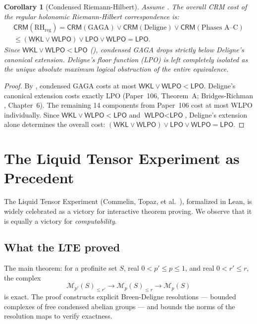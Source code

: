 \documentclass[11pt,a4paper]{article}
\theoremstyle{plain}
\newtheorem{corollary}[theorem]{Corollary}
\theoremstyle{definition}
\newcommand{\WKL}{\textsf{WKL}}
\newcommand{\WLPO}{\textsf{WLPO}}
\newcommand{\LPO}{\textsf{LPO}}
\newcommand{\CRM}{\textsf{CRM}}
\begin{document}
\begin{corollary}[Condensed Riemann-Hilbert]\label{cor:condensed-rh}
Assume .
The overall CRM cost of the regular holonomic Riemann-Hilbert correspondence is:
\begin{multline*}
\CRM(\text{RH}_{\text{reg}}) = \CRM(\text{GAGA}) \vee \CRM(\text{Deligne}) \vee \CRM(\text{Phases A--C}) \\
\le (\WKL \vee \WLPO) \vee \LPO \vee \WLPO = \LPO.
\end{multline*}
Since $\WKL \vee \WLPO < \LPO$ (), condensed GAGA drops \emph{strictly below} Deligne's canonical extension.
Deligne's floor function (\LPO) is left completely isolated as the unique absolute maximum logical obstruction of the entire equivalence.
\end{corollary}

\begin{proof}
By , condensed GAGA costs at most $\WKL \vee \WLPO < \LPO$.
Deligne's canonical extension costs exactly \LPO{} (Paper~106, Theorem~A; Bridges-Richman \cite{BridgesRichman1987}, Chapter~6).
The remaining 14 components from Paper~106 cost at most \WLPO{} individually.
Since $\WKL \vee \WLPO < \LPO$ and $\WLPO < \LPO$, Deligne's extension alone determines the overall cost: $(\WKL \vee \WLPO) \vee \LPO \vee \WLPO = \LPO$.
\end{proof}

\section{The Liquid Tensor Experiment as Precedent}
\label{sec:lte}

The Liquid Tensor Experiment (Commelin, Topaz, et al.\ \cite{Commelin2022}), formalized in Lean, is widely celebrated as a victory for interactive theorem proving.
We observe that it is equally a victory for \emph{computability}.

\subsection{What the LTE proved}

The main theorem: for a profinite set $S$, real $0 < p' \le p \le 1$, and real $0 < r' \le r$, the complex
\[
\mathcal{M}_{p'}(S)_{\le r'} \to \mathcal{M}_p(S)_{\le r} \to \mathcal{M}_p(S)
\]
is exact.
The proof constructs explicit Breen-Deligne resolutions --- bounded complexes of free condensed abelian groups --- and bounds the norms of the resolution maps to verify exactness.
\end{document}
